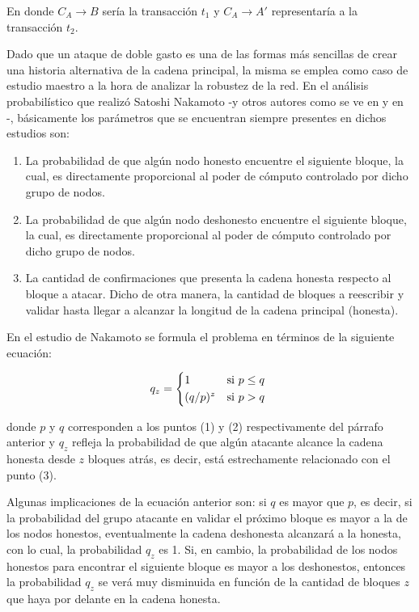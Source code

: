 En donde $C_A \rightarrow B$ sería la transacción $t_1$ y $C_A \rightarrow A'$ representaría a la transacción $t_2$.

Dado que un ataque de doble gasto es una de las formas más sencillas de crear una historia alternativa de la cadena principal, la misma se emplea como caso de estudio maestro a la hora de analizar la robustez de la red. En el análisis probabilístico que realizó Satoshi Nakamoto -y otros autores como se ve en \cite{DBLP:journals/corr/OzisikL17} y en \cite{DBLP:journals/corr/Rosenfeld14}-, básicamente los parámetros que se encuentran siempre presentes en dichos estudios son:

\begin{enumerate}
  \item La probabilidad de que algún nodo honesto encuentre el siguiente bloque, la cual, es directamente proporcional al poder de cómputo controlado por dicho grupo de nodos.
  \item La probabilidad de que algún nodo deshonesto encuentre el siguiente bloque, la cual, es directamente proporcional al poder de cómputo controlado por dicho grupo de nodos.
  \item La cantidad de confirmaciones que presenta la cadena honesta respecto al bloque a atacar. Dicho de otra manera, la cantidad de bloques a reescribir y validar hasta llegar a alcanzar la longitud de la cadena principal (honesta).
\end{enumerate}

En el estudio de Nakamoto se formula el problema en términos de la siguiente ecuación:

\begin{equation}
  q_z = \begin{cases*}
    1         & \text{si} $p \leq q$\\
    (q/p)^z   & \text{si} $p > q$
        \end{cases*}
\end{equation}

donde $p$ y $q$ corresponden a los puntos (1) y (2) respectivamente del párrafo anterior y $q_z$ refleja la probabilidad de que algún atacante alcance la cadena honesta desde $z$ bloques atrás, es decir, está estrechamente relacionado con el punto (3).

Algunas implicaciones de la ecuación anterior son: si $q$ es mayor que $p$, es decir, si la probabilidad del grupo atacante en validar el próximo bloque es mayor a la de los nodos honestos, eventualmente la cadena deshonesta alcanzará a la honesta, con lo cual, la probabilidad $q_z$ es 1. Si, en cambio, la probabilidad de los nodos honestos para encontrar el siguiente bloque es mayor a los deshonestos, entonces la probabilidad $q_z$ se verá muy disminuida en función de la cantidad de bloques $z$ que haya por delante en la cadena honesta.

